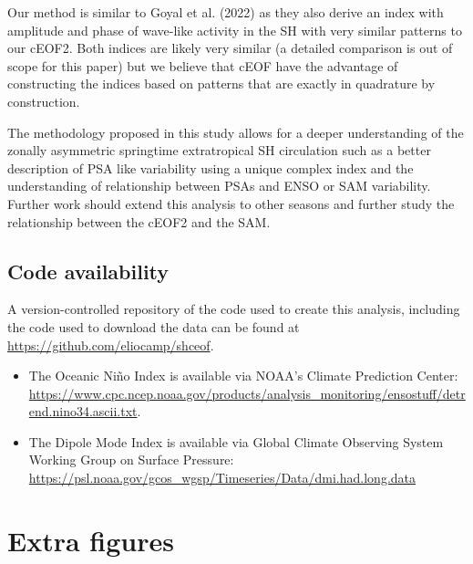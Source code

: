 \documentclass[smallextended]{svjour3}       %
\begin{document}
Our method is similar to Goyal et al. (2022) as they also derive an index with amplitude and phase of wave-like activity in the SH with very similar patterns to our cEOF2.
Both indices are likely very similar (a detailed comparison is out of scope for this paper) but we believe that cEOF have the advantage of constructing the indices based on patterns that are exactly in quadrature by construction.

The methodology proposed in this study allows for a deeper understanding of the zonally asymmetric springtime extratropical SH circulation such as a better description of PSA like variability using a unique complex index and the understanding of relationship between PSAs and ENSO or SAM variability.
Further work should extend this analysis to other seasons and further study the relationship between the cEOF2 and the SAM.

\hypertarget{code-availability}{%
\subsection*{Code availability}\label{code-availability}}

A version-controlled repository of the code used to create this analysis, including the code used to download the data can be found at \url{https://github.com/eliocamp/shceof}.

\begin{itemize}
\item
  The Oceanic Niño Index is available via NOAA's Climate Prediction Center: \url{https://www.cpc.ncep.noaa.gov/products/analysis_monitoring/ensostuff/detrend.nino34.ascii.txt}.
\item
  The Dipole Mode Index is available via Global Climate Observing System Working Group on Surface Pressure: \url{https://psl.noaa.gov/gcos_wgsp/Timeseries/Data/dmi.had.long.data}
\end{itemize}

\appendix


\hypertarget{extra-figures}{%
\section{Extra figures}\label{extra-figures}}

\newpage
\end{document}
